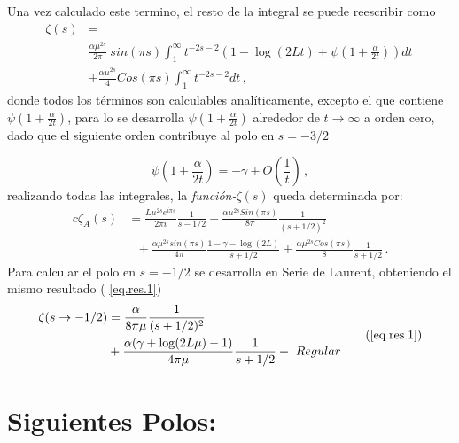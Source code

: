 Una vez calculado este termino, el resto de la integral se puede reescribir como
\begin{equation}
\begin{aligned}
	\zeta (s) &=  \\[5pt]
    & \frac{\alpha \mu ^{2s} }{2 \pi} \ sin(\pi s)
    \int _1 ^{\infty}
    t ^{-2 s-2} 
    \left(
    1 -  \log (2Lt) + \psi \left( 1 + \frac{\alpha}{2t} \right)
    \right) dt \  \\[5pt]
    & +
    \frac{\alpha \mu ^{2s} }{4} 
    Cos(\pi s)
    \int _1 ^{\infty} t^{-2s-2} dt
    	\, ,
\end{aligned}
\end{equation}
donde todos los términos son calculables analíticamente, excepto el que contiene $\psi \left( 1 + \frac{\alpha}{2t} \right)$, para lo se desarrolla $\psi \left( 1 + \frac{\alpha}{2t} \right) $ alrededor de $t \rightarrow \infty$ a orden cero, dado que el siguiente orden contribuye al polo en $s = -3/2$

\begin{equation}
    \psi(1 + \frac{\alpha}{2 t}) =
    - \gamma + O \left( \frac{1}{t} \right)
    \, ,
\end{equation}
realizando todas las integrales, la {\it función-$\zeta (s)$} queda determinada por:  
\begin{equation}
\begin{aligned}{c}
    \zeta _A (s)  &= 
    \frac{L \mu ^{2 s} e ^{i \pi s}}{2 \pi i} \frac{1}{s-1/2} 
    -\frac{\alpha \mu ^{2s} Sin(\pi s)}{8 \pi} \frac{1}{(s+1/2) ^2} \\
    & \ \ \ + \frac{\alpha \mu ^{2s} sin (\pi s) }{4 \pi } \frac{1 - \gamma -   \log (2 L)}{s+1/2}
    + \frac{\alpha \mu ^{2s} Cos(\pi s)}{8} \frac{1}{s+1/2}
    	\, .
\end{aligned}
\end{equation}
Para calcular el polo en $s=-1/2$ se desarrolla en Serie de Laurent, obteniendo el mismo resultado ( \ref{eq.res.1})
\begin{equation}
\begin{aligned}
	\zeta (s \rightarrow -1/2) &= 
    \frac{\alpha}{8 \pi \mu } \frac{1}{(s+1/2)^2} \\
    &+
	\frac{\alpha ( \gamma  +  \log (2L \mu ) -1 )}{4 \pi \mu } \frac{1}{s+1/2} + \ Regular    
\end{aligned}
\tag{\ref{eq.res.1}}
\end{equation}



\section{Siguientes Polos:} 

